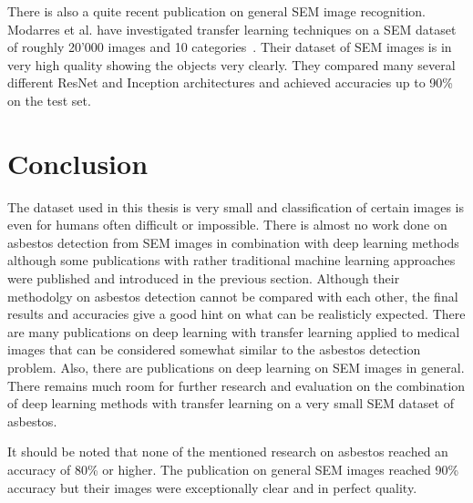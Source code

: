 There is also a quite recent publication on general SEM image recognition. Modarres et al. have investigated transfer learning techniques on a SEM dataset of roughly 20'000 images and 10 categories~\cite{modarres2017neural}. Their dataset of SEM images is in very high quality showing the objects very clearly. They compared many several different ResNet and Inception architectures and achieved accuracies up to 90\% on the test set. \\




\section{Conclusion}

The dataset used in this thesis is very small and classification of certain images is even for humans often difficult or impossible. There is almost no work done on asbestos detection from SEM images in combination with deep learning methods although some publications with rather traditional machine learning approaches were published and introduced in the previous section. Although their methodolgy on asbestos detection cannot be compared with each other, the final results  and accuracies give a good hint on what can be realisticly expected. There are many publications on deep learning with transfer learning applied to medical images that can be considered somewhat similar to the asbestos detection problem. Also, there are publications on deep learning on SEM images in general. There remains much room for further research and evaluation on the combination of deep learning methods with transfer learning on a very small SEM dataset of asbestos.

It should be noted that none of the mentioned research on asbestos reached an accuracy of 80\% or higher. The publication on general SEM images reached 90\% accuracy but their images were exceptionally clear and in perfect quality.\\

















